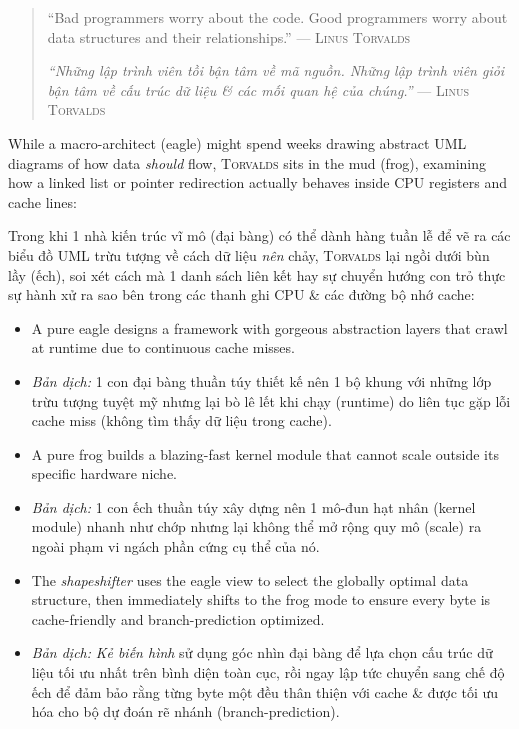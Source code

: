 \documentclass{article}
\begin{document}
\begin{quote}
	``Bad programmers worry about the code. Good programmers worry about data structures and their relationships.'' --- \textsc{Linus Torvalds} \cite{torvalds2006good}
	
	\textit{``Những lập trình viên tồi bận tâm về mã nguồn. Những lập trình viên giỏi bận tâm về cấu trúc dữ liệu \& các mối quan hệ của chúng.''} --- \textsc{Linus Torvalds} \cite{torvalds2006good}
\end{quote}

While a macro-architect (eagle) might spend weeks drawing abstract UML diagrams of how data \textit{should} flow, \textsc{Torvalds} sits in the mud (frog), examining how a linked list or pointer redirection actually behaves inside CPU registers and cache lines:

Trong khi 1 nhà kiến trúc vĩ mô (đại bàng) có thể dành hàng tuần lễ để vẽ ra các biểu đồ UML trừu tượng về cách dữ liệu \textit{nên} chảy, \textsc{Torvalds} lại ngồi dưới bùn lầy (ếch), soi xét cách mà 1 danh sách liên kết hay sự chuyển hướng con trỏ thực sự hành xử ra sao bên trong các thanh ghi CPU \& các đường bộ nhớ cache:

\begin{itemize}
	\item A pure eagle designs a framework with gorgeous abstraction layers that crawl at runtime due to continuous cache misses.
	
	\item \textit{Bản dịch:} 1 con đại bàng thuần túy thiết kế nên 1 bộ khung với những lớp trừu tượng tuyệt mỹ nhưng lại bò lê lết khi chạy (runtime) do liên tục gặp lỗi cache miss (không tìm thấy dữ liệu trong cache).
	
	\item A pure frog builds a blazing-fast kernel module that cannot scale outside its specific hardware niche.
	
	\item \textit{Bản dịch:} 1 con ếch thuần túy xây dựng nên 1 mô-đun hạt nhân (kernel module) nhanh như chớp nhưng lại không thể mở rộng quy mô (scale) ra ngoài phạm vi ngách phần cứng cụ thể của nó.
	
	\item The \textit{shapeshifter} uses the eagle view to select the globally optimal data structure, then immediately shifts to the frog mode to ensure every byte is cache-friendly and branch-prediction optimized.
	
	\item \textit{Bản dịch:} \textit{Kẻ biến hình} sử dụng góc nhìn đại bàng để lựa chọn cấu trúc dữ liệu tối ưu nhất trên bình diện toàn cục, rồi ngay lập tức chuyển sang chế độ ếch để đảm bảo rằng từng byte một đều thân thiện với cache \& được tối ưu hóa cho bộ dự đoán rẽ nhánh (branch-prediction).
\end{itemize}
\end{document}
